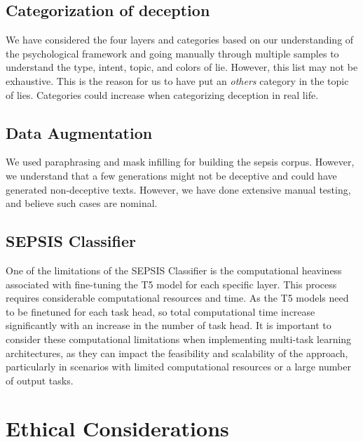 \subsection{Categorization of deception}
We have considered the four layers and categories based on our understanding of the psychological framework and going manually through multiple samples to understand the type, intent, topic, and colors of lie. However, this list may not be exhaustive. This is the reason for us to have put an \textit{others} category in the topic of lies. Categories could increase when categorizing deception in real life.

\subsection{Data Augmentation}
We used paraphrasing and mask infilling for building the sepsis corpus. However, we understand that a few generations might not be deceptive and could have generated non-deceptive texts. However, we have done extensive manual testing, and believe such cases are nominal. 

\subsection{SEPSIS Classifier}

One of the limitations of the SEPSIS Classifier is the computational heaviness associated with fine-tuning the T5 model for each specific layer. This process requires considerable computational resources and time. As the T5 models need to be finetuned for each task head, so total computational time increase significantly with an increase in the number of task head. It is important to consider these computational limitations when implementing multi-task learning architectures, as they can impact the feasibility and scalability of the approach, particularly in scenarios with limited computational resources or a large number of output tasks.



\section{Ethical Considerations}


